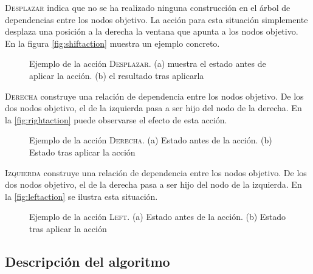 \textsc{Desplazar} indica que no se ha realizado ninguna construcción en el
árbol de dependencias entre los nodos objetivo. La acción para esta situación
simplemente desplaza una posición a la derecha la ventana que apunta a los nodos
objetivo. En la figura \autoref{fig:shiftaction} muestra un ejemplo concreto.
\begin{figure}[ht]
  \caption{Ejemplo de la acción \textsc{Desplazar}. (a) muestra el estado antes
    de aplicar la acción. (b) el resultado tras aplicarla}
  \label{fig:shiftaction}
\end{figure}
\textsc{Derecha} construye una relación de dependencia entre los nodos
objetivo. De los dos nodos objetivo, el de la izquierda pasa a ser hijo
del nodo de la derecha. En la \autoref{fig:rightaction} puede observarse el
efecto de esta acción.
\begin{figure}[ht]
  \caption{Ejemplo de la acción \textsc{Derecha}. (a) Estado antes de la
    acción. (b) Estado tras aplicar la acción}
  \label{fig:rightaction}
\end{figure}
\textsc{Izquierda} construye una relación de dependencia entre los nodos
objetivo. De los dos nodos objetivo, el de la derecha pasa a ser hijo del nodo
de la izquierda. En la \autoref{fig:leftaction} se ilustra esta situación.
\begin{figure}[ht]
  \caption{Ejemplo de la acción \textsc{Left}. (a) Estado antes de la
    acción. (b) Estado tras aplicar la acción}
  \label{fig:leftaction}
\end{figure}

\subsection{Descripción del algoritmo}
\label{subsec:algdesc}

